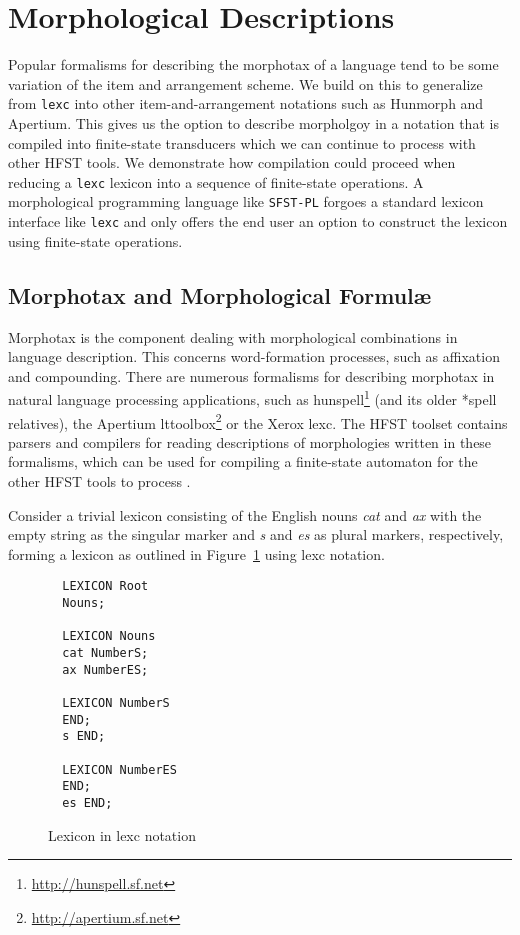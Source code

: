 \documentclass{llncs}
\begin{document}
\section{Morphological Descriptions}\label{MorphTools}



Popular formalisms for describing the morphotax of a language tend to be some variation 
of the item and arrangement scheme. We build on this to generalize from \verb!lexc! into other
item-and-arrangement notations such as Hunmorph and Apertium. This gives us the option to describe 
morpholgoy in a notation that is compiled into finite-state transducers which we can continue to process with other
HFST tools. We demonstrate how compilation could proceed when reducing a \verb!lexc! lexicon into a sequence of
finite-state operations. A morphological programming language like \verb!SFST-PL! forgoes a standard lexicon interface
like \verb!lexc! and only offers the end user an option to construct the lexicon using finite-state operations.

\subsection{Morphotax and Morphological Formul\ae}

Morphotax is the component dealing with morphological combinations
in language description. This concerns word-formation processes, such as affixation and compounding. 
There are numerous formalisms for describing morphotax in natural language processing applications, 
such as hunspell\footnote{\url{http://hunspell.sf.net}} (and its older *spell relatives),
the Apertium lttoolbox\footnote{\url{http://apertium.sf.net}}
or the Xerox lexc\cite{beesley/2003}. The HFST toolset contains parsers and compilers 
for reading descriptions of morphologies written in these formalisms, which can be used for 
compiling a finite-state automaton for the other HFST tools to process 
\cite{pirinen/2010/il,linden/2009/sfcm}.

Consider a trivial lexicon consisting of the English nouns \emph{cat} and \emph{ax} with
the empty string as the singular marker and \emph{s} and \emph{es} as plural markers, respectively,  
forming a lexicon as outlined in Figure~\ref{fig:morph0} using lexc notation.

\begin{figure} [h]
{\footnotesize
\begin{verbatim}
  LEXICON Root
  Nouns;

  LEXICON Nouns
  cat NumberS;
  ax NumberES;

  LEXICON NumberS
  END;
  s END;

  LEXICON NumberES
  END;
  es END;
\end{verbatim}
}
\caption{Lexicon in lexc notation}
\label{fig:morph0}
\end{figure}
\end{document}
